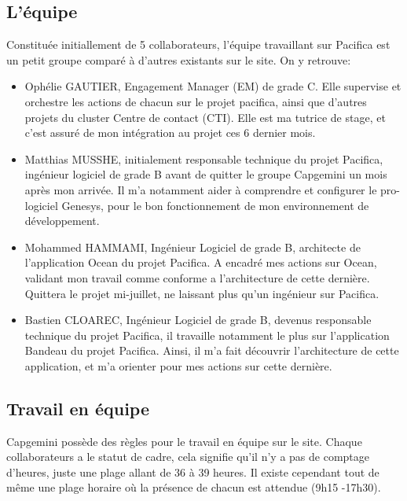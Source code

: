 \documentclass{rapport}
\begin{document}
\subsection{L'équipe}

Constituée initiallement de 5 collaborateurs, l'équipe travaillant sur Pacifica est un petit groupe comparé à d'autres existants sur le site.
On y retrouve:\\

\begin{itemize}
  \item Ophélie GAUTIER, Engagement Manager (EM) de grade C. Elle supervise et orchestre les actions de chacun sur le projet pacifica, ainsi que d'autres projets du cluster Centre de contact (CTI). Elle est ma tutrice de stage, et c'est assuré de mon intégration au projet ces 6 dernier mois.\\
  
  \item Matthias MUSSHE, initialement responsable technique du projet Pacifica, ingénieur logiciel de grade B avant de quitter le groupe Capgemini un mois après mon arrivée. Il m'a notamment aider à comprendre et configurer le pro-logiciel Genesys, pour le bon fonctionnement de mon environnement de développement.\\
  
  \item Mohammed HAMMAMI, Ingénieur Logiciel de grade B, architecte de l'application Ocean du projet Pacifica. A encadré mes actions sur Ocean, validant mon travail comme conforme a l'architecture de cette dernière. Quittera le projet mi-juillet, ne laissant plus qu'un ingénieur sur Pacifica.\\
  
  \item Bastien CLOAREC, Ingénieur Logiciel de grade B, devenus responsable technique du projet Pacifica, il travaille notamment le plus sur l'application Bandeau du projet Pacifica. Ainsi, il m'a fait découvrir l'architecture de cette application, et m'a orienter pour mes actions sur cette dernière.\\
  
\end{itemize}

\subsection{Travail en équipe}
Capgemini possède des règles pour le travail en équipe sur le site. Chaque collaborateurs a le statut de cadre, cela signifie qu'il n'y a pas de comptage d'heures, juste une plage allant de 36 à 39 heures. Il existe cependant tout de même une plage horaire où la présence de chacun est attendue (9h15 -17h30).\\
\end{document}
